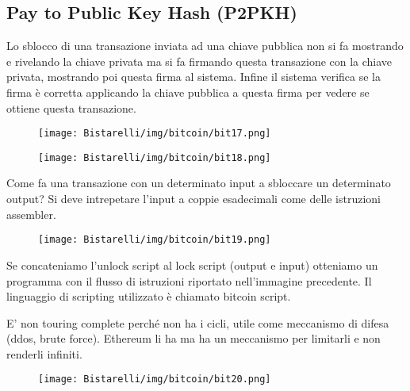\subsection{Pay to Public Key Hash (P2PKH)}
Lo sblocco di una transazione inviata ad una chiave pubblica non si fa mostrando e rivelando la chiave privata ma
si fa firmando questa transazione con la chiave privata, mostrando poi questa firma al sistema. Infine il sistema
verifica se la firma è corretta applicando la chiave pubblica a questa firma per vedere se ottiene questa transazione.

\begin{figure}[H]
	\centering
    \texttt{[image: Bistarelli/img/bitcoin/bit17.png]}
\end{figure}

\begin{figure}[H]
	\centering
    \texttt{[image: Bistarelli/img/bitcoin/bit18.png]}
\end{figure}

Come fa una transazione con un determinato input a sbloccare un determinato output? Si deve intrepetare l’input
a coppie esadecimali come delle istruzioni assembler.

\begin{figure}[H]
	\centering
    \texttt{[image: Bistarelli/img/bitcoin/bit19.png]}
\end{figure}

Se concateniamo l’unlock script al lock script (output e input) otteniamo un programma con il flusso di istruzioni
riportato nell’immagine precedente. Il linguaggio di scripting utilizzato è chiamato bitcoin script.

\singlespacing

E' non touring complete perché non ha i cicli, utile come meccanismo di difesa (ddos, brute force). Ethereum
li ha ma ha un meccanismo per limitarli e non renderli infiniti.

\begin{figure}[H]
	\centering
    \texttt{[image: Bistarelli/img/bitcoin/bit20.png]}
\end{figure}

